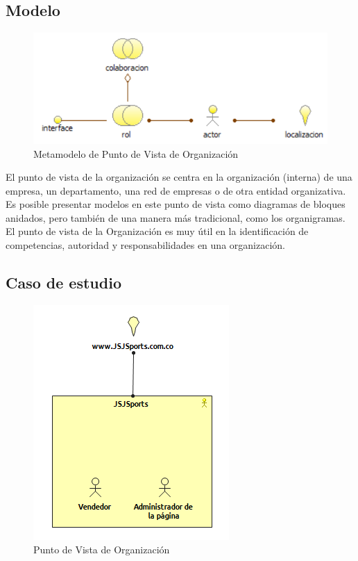 \subsection{Modelo}
\begin{figure}[th!]
	\centering
	\includegraphics[width=0.5\linewidth]{arquitectura/imagenes/modeloOrganizacion}
	\caption{Metamodelo de Punto de Vista de Organización  \cite{pun1}}
	\label{fig:metamodelo de punto de vista de organizacion}
\end{figure}
El punto de vista de la organización se centra en la organización (interna) de una empresa, un departamento, una red de empresas o de otra entidad organizativa. Es posible presentar modelos en este punto de vista como diagramas de bloques anidados, pero también de una manera más tradicional, como los organigramas. El punto de vista de la Organización es muy útil  en la identificación de competencias, autoridad y responsabilidades en una organización.


\subsection{Caso de estudio}


\begin{figure}[!th]
	\centering
	\includegraphics[width=0.5\linewidth]{arquitectura/imagenes/vistaOrganizacion}
	\caption{Punto de Vista de Organización}
	\label{fig:Punto de vista organizacion}
\end{figure}

